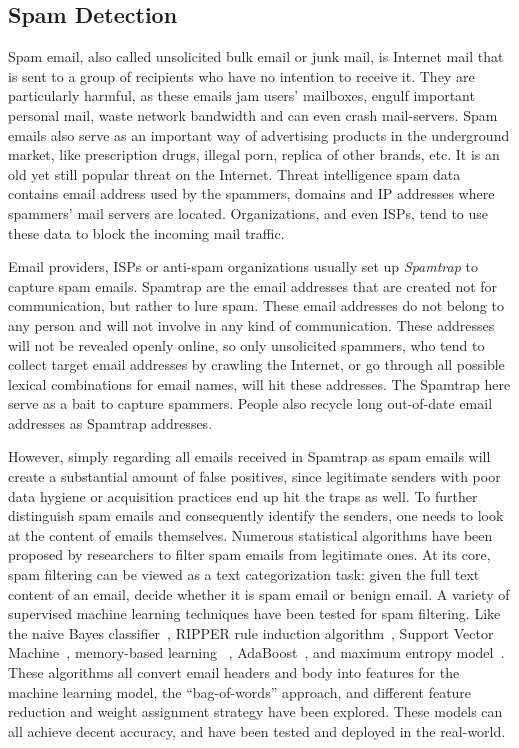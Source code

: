 \subsection{Spam Detection}
Spam email, also called unsolicited bulk email or junk mail, is 
Internet mail that is sent to a group of recipients who have no intention 
to receive it. They are particularly harmful, as these emails jam users' 
mailboxes, engulf important personal mail, waste network bandwidth and 
can even crash mail-servers. Spam emails also serve as an important
way of advertising products in the underground market, like prescription drugs, 
illegal porn, replica of other brands, etc. It is an old yet still popular
threat on the Internet. Threat intelligence spam data contains email address 
used by the spammers, domains and IP addresses where spammers' mail servers 
are located. Organizations, and even ISPs, tend to use these data to block 
the incoming mail traffic.

Email providers, ISPs or anti-spam organizations usually set up 
\textit{Spamtrap} to capture spam emails. Spamtrap are the email addresses
that are created not for communication, but rather to lure spam. These
email addresses do not belong to any person and will not involve in any
kind of communication. These addresses will not be revealed openly online,
so only unsolicited spammers, who tend to collect target email addresses
by crawling the Internet, or go through all possible lexical combinations
for email names, will hit these addresses. The Spamtrap here serve as a 
bait to capture spammers. People also recycle long out-of-date email 
addresses as Spamtrap addresses. 

However, simply regarding all emails received in Spamtrap as spam emails 
will create a substantial amount of false positives, since legitimate 
senders with poor data hygiene or acquisition practices end up hit the traps 
as well. To further distinguish spam emails and consequently identify the
senders, one needs to look at the content of emails themselves. Numerous 
statistical algorithms have been proposed by researchers to filter spam
emails from legitimate ones. At its core, spam filtering can be viewed as
a text categorization task: given the full text content of an email, 
decide whether it is spam email or benign email. A variety of supervised
machine learning techniques have been tested for spam filtering. Like the
naive Bayes classifier~\cite{androutsopoulos2000evaluation, sahami1998bayesian, schneider2003comparison}, 
RIPPER rule induction algorithm~\cite{cohen1996learning},
Support Vector Machine~\cite{drucker1999support}, memory-based learning
~\cite{androutsopoulos2000learning}, AdaBoost~\cite{carreras2001boosting},
and maximum entropy model~\cite{zhang2003filtering}. These algorithms all
convert email headers and body into features for the machine learning model, 
the ``bag-of-words'' approach,
and different feature reduction and weight assignment strategy have been
explored. These models can all achieve decent accuracy, and have been tested
and deployed in the real-world. 

